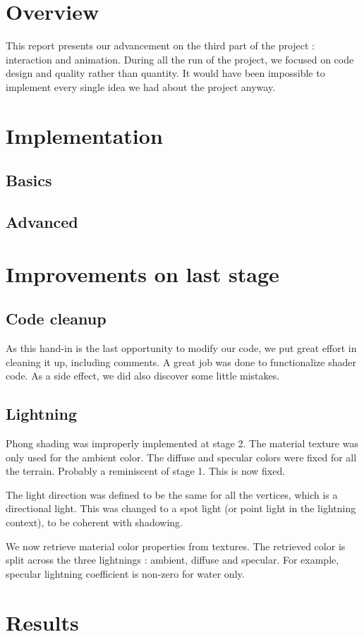 \documentclass[a4paper,11pt]{article}
\begin{document}
\section{Overview}

This report presents our advancement on the third part of the project : interaction and animation. During all the run of the project, we focused on code design and quality rather than quantity. It would have been impossible to implement every single idea we had about the project anyway.


\section{Implementation}

\subsection{Basics}

\subsection{Advanced}


\section{Improvements on last stage}

\subsection{Code cleanup}

As this hand-in is the last opportunity to modify our code, we put great effort in cleaning it up, including comments. A great job was done to functionalize shader code. As a side effect, we did also discover some little mistakes.

\subsection{Lightning}

Phong shading was improperly implemented at stage 2. The material texture was only used for the ambient color. The diffuse and specular colors were fixed for all the terrain. Probably a reminiscent of stage 1. This is now fixed.

The light direction was defined to be the same for all the vertices, which is a directional light. This was changed to a spot light (or point light in the lightning context), to be coherent with shadowing.

We now retrieve material color properties from textures. The retrieved color is split across the three lightnings : ambient, diffuse and specular. For example, specular lightning coefficient is non-zero for water only.

\section{Results}
\end{document}
